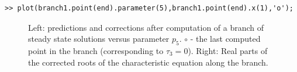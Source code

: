\documentclass[10pt]{article}
\begin{document}
{{\small\begin{verbatim}
>> plot(branch1.point(end).parameter(5),branch1.point(end).x(1),'o');
\end{verbatim}}

\begin{figure}[h]
\begin{center}
\end{center}
\caption{\small\label{br_stst} Left: predictions and corrections
after computation of a branch of steady state solutions versus
parameter $p_5$. $\circ$ - the last computed point in the branch
(corresponding to $\tau_3=0$). Right: Real parts of the corrected roots 
of the characteristic equation along the branch.}
\end{figure}

}
\end{document}
